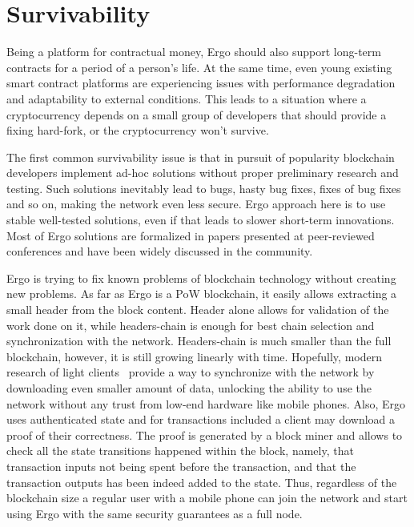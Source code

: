 \section{Survivability}
\label{sec:survivability}


Being a platform for contractual money, Ergo should also support long-term contracts for a
period of a person's life.
At the same time, even young existing smart contract platforms are experiencing issues with performance degradation and
adaptability to external conditions.
This leads to a situation where a cryptocurrency depends on a small group of developers
that should provide a fixing hard-fork, or the cryptocurrency won't survive.

The first common survivability issue is that in pursuit of popularity blockchain developers implement ad-hoc
solutions without proper preliminary research and testing.
Such solutions inevitably lead to bugs, hasty bug fixes, fixes of bug fixes and so on, making the network even less secure.
Ergo approach here is to use stable well-tested solutions, even if that leads to slower
short-term innovations.
Most of Ergo solutions are formalized in papers presented at peer-reviewed conferences
and have been widely discussed in the community.

Ergo is trying to fix known problems of blockchain technology without creating new problems.
As far as Ergo is a PoW blockchain, it easily allows extracting a small header from the block content.
Header alone allows for validation of the work done on it, while headers-chain is enough for best chain selection
and synchronization with the network.
Headers-chain is much smaller than the full blockchain, however, it is still growing linearly with time.
Hopefully, modern research of light clients~\cite{kiayias2017non,luuflyclient} provide a way to
synchronize with the network by downloading even smaller amount of data, unlocking the ability to
use the network without any trust from low-end hardware like mobile phones.
Also, Ergo uses authenticated state\cite{reyzin2017improving} and for transactions included
a client may download a proof of their correctness.
The proof is generated by a block miner and allows to check all the state transitions happened within the block, namely,
that transaction inputs not being spent before the transaction, and that the
transaction outputs has been indeed added to the state.
Thus, regardless of the blockchain size a regular user with
a mobile phone can join the network and start using Ergo with the same security
guarantees as a full node. 

